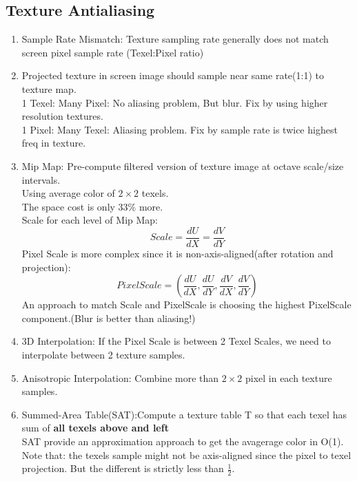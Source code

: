 \documentclass[cyan,normal,en]{elegantnote}
\begin{document}
\subsection{Texture Antialiasing}
\begin{enumerate}
	\item Sample Rate Mismatch: Texture sampling rate generally does not match screen pixel sample rate (Texel:Pixel ratio)
	\item Projected texture in screen image should sample near same rate(1:1) to texture map.\\
	1 Texel: Many Pixel: No aliasing problem, But blur. Fix by using higher resolution textures.\\
	1 Pixel: Many Texel: Aliasing problem. Fix by sample rate is twice highest freq in texture.
	\item Mip Map: Pre-compute filtered version of texture image at octave scale/size intervals.\\
	Using average color of $2 \times 2$ texels.\\
	The space cost is only $33\%$ more.\\
	Scale for each level of Mip Map:
	$$Scale=\frac{dU}{dX}=\frac{dV}{dY}$$
	Pixel Scale is more complex since it is non-axis-aligned(after rotation and projection):
	$$PixelScale=(\frac{dU}{dX},\frac{dU}{dY},\frac{dV}{dX},\frac{dV}{dY})$$
	An approach to match Scale and PixelScale is choosing the highest PixelScale component.(Blur is better than aliasing!)
	\item 3D Interpolation: If the Pixel Scale is between 2 Texel Scales, we need to interpolate between 2 texture samples.
	\item Anisotropic Interpolation: Combine more than $2 \times 2$ pixel in each texture samples.
	\item Summed-Area Table(SAT):Compute a texture table T so that each texel has sum of \textbf{all texels above and left}\\
	SAT provide an approximation approach to get the avagerage color in O(1).\\
	Note that: the texels sample might not be axis-aligned since	 the pixel to texel projection. But the different is strictly less than $\frac{1}{2}$.
\end{enumerate}
\newpage
\end{document}
